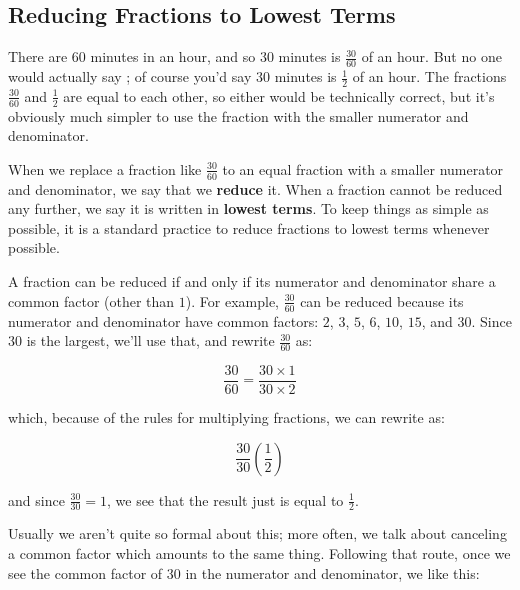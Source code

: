 \bigskip 

%
%

\subsection{Reducing Fractions to Lowest Terms}

There are $60$ minutes in an hour, and so $30$ minutes is $\frac{30}{60}$ of an hour. But no one would actually say ; of course you’d say $30$ minutes is $\frac{1}{2}$ of an hour. The fractions $\frac{30}{60}$ and $\frac{1}{2}$ are equal to each other, so either would be technically correct, but it’s obviously much simpler to use the fraction with the smaller numerator and denominator.

When we replace a fraction like $\frac{30}{60}$ to an equal fraction with a smaller numerator and denominator, we say that we \textbf{reduce} it. When a fraction cannot be reduced any further, we say it is written in \textbf{lowest terms}. To keep things as simple as possible, it is a standard practice to reduce fractions to lowest terms whenever possible.

A fraction can be reduced if and only if its numerator and denominator share a common factor (other than $1$). For example, $\displaystyle \frac{30}{60}$ can be reduced because its numerator and denominator have common factors: $2$, $3$, $5$, $6$, $10$, $15$, and $30$. Since $30$ is the largest, we’ll use that, and rewrite $\displaystyle \frac{30}{60}$ as:

$$\frac{30}{60} = \frac{30 \times 1}{30 \times 2}$$

which, because of the rules for multiplying fractions, we can rewrite as:

$$\frac{30}{30}\left(\frac{1}{2}\right)$$

and since $\displaystyle \frac{30}{30} = 1$, we see that the result just is equal to $\displaystyle \frac{1}{2}$.

Usually we aren’t quite so formal about this; more often, we talk about canceling a common factor which amounts to the same thing. Following that route, once we see the common factor of $30$ in the numerator and denominator, we  like this:

